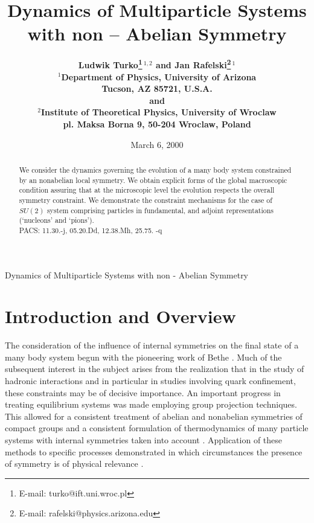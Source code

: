 \documentclass[a4paper,11pt]{article}
\begin{document}
\pagestyle{myheadings}
{Dynamics of Multiparticle Systems with non - Abelian Symmetry}
\title{Dynamics of Multiparticle Systems with non -- Abelian
Symmetry}
\author{
$\ $\\
\bf  Ludwik Turko\footnote{E-mail: turko@ift.uni.wroc.pl}$^{\ 1,2}$ and
Jan Rafelski\footnote{E-mail: rafelski@physics.arizona.edu}$^{\ 1}$\\
$\ $\\
$^1$Department of Physics, University of Arizona\\
 Tucson, AZ 85721, U.S.A.\\
$\ $\\ and\\ $\ $\\
$^{2}$Institute of Theoretical Physics, University of Wroclaw\\
pl. Maksa Borna 9, 50-204 Wroclaw, Poland}
\date{March 6, 2000}   %
\maketitle
\thispagestyle{empty}
\begin{abstract}
{\noindent
We consider the dynamics governing the evolution of
a many body  system constrained by an
nonabelian local  symmetry. We obtain explicit
forms of the global macroscopic
condition assuring that at the  microscopic level  the evolution
 respects the overall symmetry constraint. We demonstrate the
constraint mechanisms for the case of $SU(2)$ system comprising
particles in fundamental, and adjoint representations (`nucleons'
and `pions').\\

PACS: 11.30.-j, 05.20.Dd, 12.38.Mh, 25.75. -q
 }
\end{abstract}
\section{\normalsize\bf Introduction and Overview}\label{intr}
\noindent
 The consideration of the influence of internal symmetries on the
final state of a many body system begun with the pioneering work
of Bethe \cite{Bethe}. Much of the subsequent interest in the
subject arises from the realization that in the study of hadronic
interactions and in particular in studies involving quark
confinement, these constraints may be of decisive importance. An
important progress in treating equilibrium systems was made
employing group projection techniques. This allowed for a
consistent treatment of abelian \cite{Magal} and nonabelian
\cite{Cerul,Erics,Zalew,Erik,Skag} symmetries of compact groups
and a consistent formulation of thermodynamics of many particle
systems with internal symmetries taken into account
\cite{TurRed,Turko}. Application of these methods to specific
processes demonstrated in which circumstances the presence of
symmetry is of physical relevance \cite{RafDan,MullRaf,Elze}.
\end{document}
